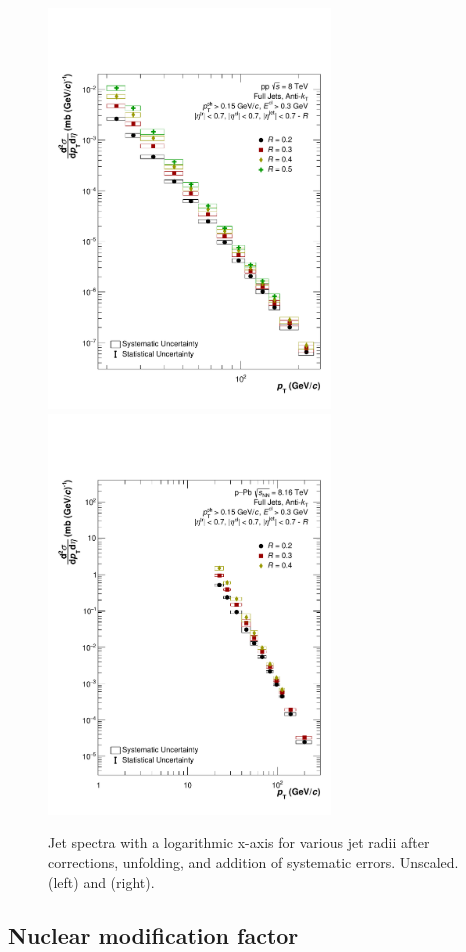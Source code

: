 \begin{figure}
    \centering
    \includegraphics[width=7.5cm]{figures/FinalResults/Bayes_reg6_logx_unscaled.pdf}
    \includegraphics[width=7.5cm]{figures/pPbFigures/FinalResults/Bayes_reg6_logx_unscaled.pdf}
    \caption{Jet spectra with a logarithmic x-axis for various jet radii after corrections, unfolding, and addition of systematic errors. Unscaled. \pp (left) and \pPb (right).}
    \label{fig:finalSpectraUnscaledLogX}
\end{figure}

\subsection{Nuclear modification factor}
\label{sec:resultsRpA}

